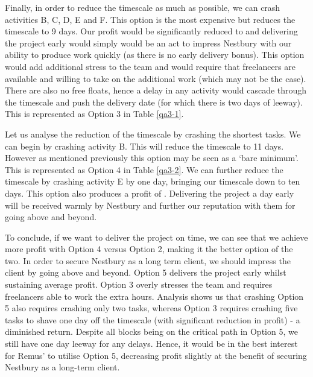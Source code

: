 \documentclass[11pt]{article}
\begin{document}
Finally, in order to reduce the timescale as much as possible, we can crash activities B, C, D, E and F. This option is the most expensive but reduces the timescale to 9 days. Our profit would be significantly reduced to \Pounds[11000] and delivering the project early would simply would be an act to impress Nestbury with our ability to produce work quickly (as there is no early delivery bonus). This option would add additional stress to the team and would require that freelancers are available and willing to take on the additional work (which may not be the case). There are also no free floats, hence a delay in any activity would cascade through the timescale and push the delivery date (for which there is two days of leeway). This is represented as Option 3 in Table \ref{qa3-1}.

Let us analyse the reduction of the timescale by crashing the shortest tasks. We can begin by crashing activity B. This will reduce the timescale to 11 days. However as mentioned previously this option may be seen as a `bare minimum'. This is represented as Option 4 in Table \ref{qa3-2}. We can further reduce the timescale by crashing activity E by one day, bringing our timescale down to ten days. This option also produces a profit of \Pounds[18000]. Delivering the project a day early will be received warmly by Nestbury and further our reputation with them for going above and beyond. 

To conclude, if we want to deliver the project on time, we can see that we achieve more profit with Option 4 versus Option 2, making it the better option of the two. In order to secure Nestbury as a long term client, we should impress the client by going above and beyond. Option 5 delivers the project early whilst sustaining average profit. Option 3 overly stresses the team and requires freelancers able to work the extra hours. Analysis shows us that crashing Option 5 also requires crashing only two tasks, whereas Option 3 requires crashing five tasks to shave one day off the timescale (with significant reduction in profit) - a diminished return. Despite all blocks being on the critical path in Option 5, we still have one day leeway for any delays. Hence, it would be in the best interest for Remus' to utilise Option 5, decreasing profit slightly at the benefit of securing Nestbury as a long-term client.
\end{document}
